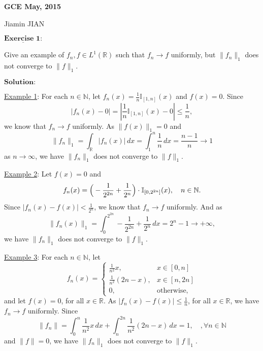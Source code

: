 \documentclass[12pt,a4paper]{ctexart}
\begin{document}
\begin{center}
\textbf{ GCE May, 2015}
\vspace{8pt}

Jiamin JIAN
\end{center}

\vspace{12pt}

$\underline{\textbf{Exercise 1:}}$

Give an example of $f_{n}, f \in L^{1}(\mathbb{R})$ such that $f_{n} \to f$ uniformly, but $\|f_{n}\|_{1}$ does not converge to $\|f\|_{1}$.


\vspace{8pt}

$\textbf{Solution:}$

\underline{Example 1}: For each $n \in \mathbb N$, let $f_{n}(x) = \frac{1}{n} \mathbb{I}_{[1, n]} (x)$ and $f(x) = 0$. Since
\begin{equation*}
    |f_{n}(x) - 0| = |\frac{1}{n} \mathbb{I}_{[1, n]} (x) - 0| \leq \frac{1}{n},
\end{equation*}
we know that $f_{n} \to f$ uniformly. As $\|f(x)\|_{1} = 0$ and 
\begin{equation*}
    \|f_{n}\|_{1} = \int_{\mathbb{R}}^{} |f_{n}(x)| \, d x = \int_{1}^{n} \frac{1}{n} \, d x = \frac{n-1}{n} \to 1
\end{equation*}
as $n \to \infty$, we have $\|f_{n}\|_{1}$ does not converge to $\|f\|_{1}$.

\underline{Example 2}: Let $f(x) = 0$ and 
\begin{equation*}
    f_{n}(x) = \Big{(} - \frac{1}{2^{2n}} + \frac{1}{2^{n}} \Big{)} \cdot \mathbb{I}_{[0, 2^{2n}]} (x), \quad  n \in \mathbb N.
\end{equation*}
Since $|f_{n}(x) - f(x)| < \frac{1}{2^{n}}$, we know that $f_{n} \to f$ uniformly. And as
\begin{equation*}
    \|f_{n}(x)\|_{1} = \int_{0}^{2^{2n}}  - \frac{1}{2^{2n}} + \frac{1}{2^{n}} \, d x = 2^{n} - 1 \to + \infty,
\end{equation*}
we have $\|f_{n}\|_{1}$ does not converge to $\|f\|_{1}$.

\underline{Example 3}: For each $n \in \mathbb N$, let
\begin{equation*}
f_n (x) =
\left\{
             \begin{array}{cl}
             \frac{1}{n^2} x, & x \in [0,n] \\
             \frac{1}{n^2} (2n - x), & x \in [n, 2n] \\
             0, & \text{otherwise},
             \end{array}
\right.
\end{equation*}
and let $f(x) = 0$, for all $x \in \mathbb R$. As $|f_n (x) - f(x)| \leq \frac{1}{n}$, for all $x \in \mathbb R$, we have $f_n \to f$ uniformly. Since
$$\|f_n\| = \int_{0}^{n} \frac{1}{n^2} x \, d x + \int_{n}^{2n} \frac{1}{n^2} (2n - x) \, d x = 1, \quad, \forall n \in \mathbb N$$
and $\|f\| = 0$, we have $\|f_{n}\|_{1}$ does not converge to $\|f\|_{1}$.
\end{document}
